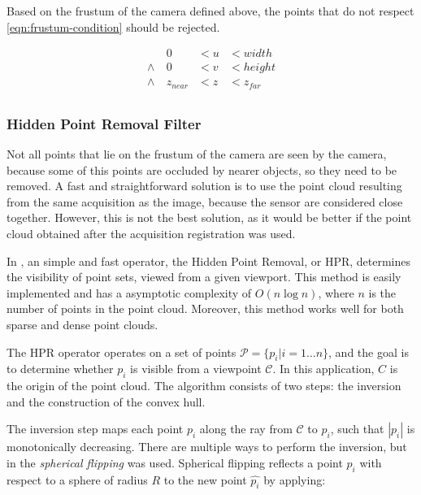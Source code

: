Based on the frustum of the camera defined above, the points that do not respect \cref{eqn:frustum-condition} should be rejected.

\begin{equation}
    \label{eqn:frustum-condition}
    \begin{aligned}
                 & 0        & < u & < width \\
        \wedge \ & 0        & < v & < height \\
        \wedge \ & z_{near} & < z & < z_{far} \\
    \end{aligned}
\end{equation}

\subsubsection{Hidden Point Removal Filter}

Not all points that lie on the frustum of the camera are seen by the camera, because some of this points are occluded by nearer objects, so they need to be removed. A fast and straightforward solution is to use the point cloud resulting from the same acquisition as the image, because the sensor are considered close together. However, this is not the best solution, as it would be better if the point cloud obtained after the acquisition registration was used.

In \cite{katz07}, an simple and fast operator, the Hidden Point Removal, or HPR, determines the visibility of point sets, viewed from a given viewport. This method is easily implemented and has a asymptotic complexity of $O(n \log n)$, where $n$ is the number of points in the point cloud. Moreover, this method works well for both sparse and dense point clouds.

The HPR operator operates on a set of points $\mathcal{P} = \{p_i | i = 1 \dots n \}$, and the goal is to determine whether $p_i$ is visible from a viewpoint $\mathcal{C}$. In this application, $C$ is the origin of the point cloud. The algorithm consists of two steps: the inversion and the construction of the convex hull.

The inversion step maps each point $p_i$ along the ray from $\mathcal{C}$ to $p_i$, such that $|p_i|$ is monotonically decreasing. There are multiple ways to perform the inversion, but in \cite{katz07} the \emph{spherical flipping} was used. Spherical flipping reflects a point $p_i$ with respect to a sphere of radius $R$ to the new point $\hat{p_i}$ by applying:

